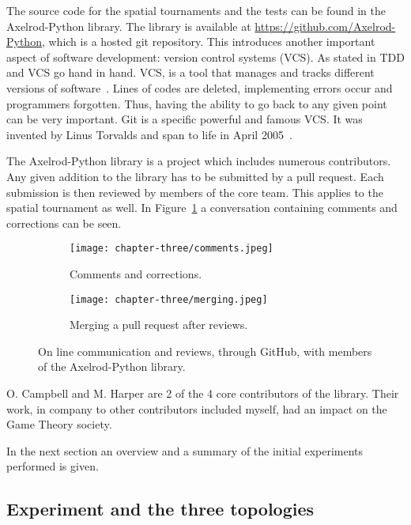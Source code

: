 The source code for the spatial tournaments and the tests can be found
in the Axelrod-Python library. The library is available at
\url{https://github.com/Axelrod-Python},
which is a hosted git repository. This introduces another important aspect
of software development: version control systems (VCS). As stated in \cite{Developer}
TDD and VCS go hand in hand. VCS, is a tool that manages and tracks different
versions of software~\cite{Vogel2014}. Lines of codes are deleted, implementing
errors occur and programmers forgotten. Thus, having the ability to go back to any
given point can be very important. Git is a specific powerful and famous VCS. It
was invented by Linus Torvalds and span to life in April 2005~\cite{Vogel2014}.

The Axelrod-Python library is a project which includes numerous contributors.
Any given addition to the
library has to be submitted by a pull request. Each submission is then
reviewed by members of the core team. This applies to the spatial tournament as well.
In Figure~\ref{fig:github} a conversation containing comments and corrections
can be seen.

\begin{figure}[H]
\centering
    \begin{subfigure}[H]{0.7\textwidth}
    \centering
        \texttt{[image: chapter-three/comments.jpeg]}
    \caption{Comments and corrections.}
    \end{subfigure}
\hfill
    \begin{subfigure}[H]{0.7\textwidth}\centering
    \centering
        \texttt{[image: chapter-three/merging.jpeg]}
    \caption{Merging a pull request after reviews.}
    \end{subfigure}
\caption{On line communication and reviews, through GitHub,
         with members of the Axelrod-Python library.}
\label{fig:github}
\end{figure}

O. Campbell and M. Harper are 2 of the 4 core contributors of the library.
Their work, in company to other contributors included myself, had an impact on
the Game Theory society.

In the next section an overview and a summary of the initial experiments
performed is given.


\subsection{Experiment and the three topologies}

